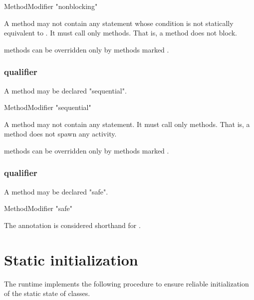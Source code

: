 \begin{grammar}
  MethodModifier \: \xcd"nonblocking"  
\end{grammar}

A  method may not
contain any  statement whose condition
is not statically equivalent to . It must call only
 methods. That is, a  method does not block.

 methods can be overridden only by methods marked .

\subsubsection{ qualifier}
\label{SequentialAnnotation}
\label{SequentialMethod}

A method may be declared \xcd"sequential".

\begin{grammar}
  MethodModifier \: \xcd"sequential"  
\end{grammar}

A  method may not contain any 
statement. It must call only  methods. That is, a
 method does not spawn any activity.

 methods can be overridden only by methods marked .

\subsubsection{ qualifier}
\label{SafeAnnotation}
\label{SafeMethod}

A method may be declared \xcd"safe".

\begin{grammar}
  MethodModifier \: \xcd"safe"  
\end{grammar}

The  annotation is considered shorthand for .


\section{Static initialization}
\label{StaticInitialization}
The \Xten{} runtime implements the following procedure to ensure
reliable initialization of the static state of classes.


